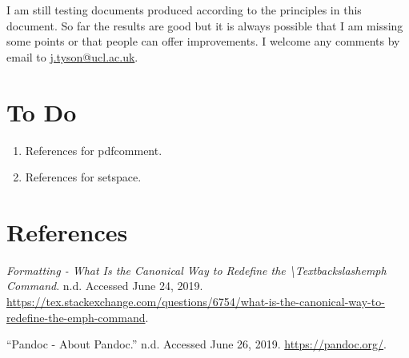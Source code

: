 \documentclass[]{article}
\begin{document}
I am still testing documents produced according to the principles in
this document. So far the results are good but it is always possible
that I am missing some points or that people can offer improvements. I
welcome any comments by email to
\href{my\%20ucl\%20email\%20address}{j.tyson@ucl.ac.uk}.

\hypertarget{to-do}{%
\section{To Do}\label{to-do}}

\begin{enumerate}
\def\labelenumi{\arabic{enumi}.}
\item
  References for pdfcomment.
\item
  References for setspace.
\end{enumerate}
\hypertarget{references}{%
\section*{References}\label{references}}

\hypertarget{refs}{}
\leavevmode\hypertarget{ref-defineemph}{}%
\emph{Formatting - What Is the Canonical Way to Redefine the
\textbackslash{}Textbackslashemph Command}. n.d. Accessed June 24, 2019.
\url{https://tex.stackexchange.com/questions/6754/what-is-the-canonical-way-to-redefine-the-emph-command}.

\leavevmode\hypertarget{ref-pandoc}{}%
``Pandoc - About Pandoc.'' n.d. Accessed June 26, 2019.
\url{https://pandoc.org/}.
\end{document}
